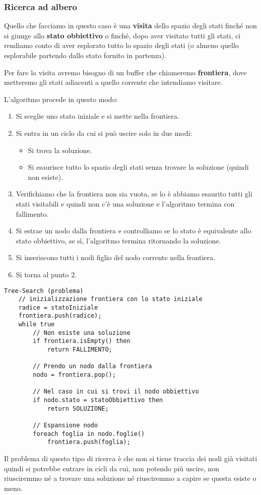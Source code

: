 \subsubsection{Ricerca ad albero}
Quello che facciamo in questo caso \`e una \textbf{visita} dello spazio degli stati finch\'e non
si giunge allo \textbf{stato obbiettivo} o finch\'e, dopo aver visitato tutti gli stati, ci
rendiamo conto di aver esplorato tutto lo spazio degli stati (o almeno quello esplorabile
partendo dallo stato fornito in partenza).

Per fare la visita avremo bisogno di un buffer che chiameremo \textbf{frontiera}, dove metteremo
gli stati adiacenti a quello corrente che intendiamo visitare.

\newpage
L'algoritmo procede in questo modo:
\begin{enumerate}
	\item Si sceglie uno stato iniziale e si mette nella frontiera.
	\item Si entra in un ciclo da cui si pu\`o uscire solo in due modi:
	      \begin{itemize}
		      \item Si trova la soluzione.
		      \item Si esaurisce tutto lo spazio degli stati senza trovare la soluzione (quindi
		            non esiste).
	      \end{itemize}
	\item Verifichiamo che la frontiera non sia vuota, se lo \`e abbiamo esaurito tutti gli
	      stati visitabili e quindi non c'\`e una soluzione e l'algoritmo termina con
	      fallimento.
	\item Si estrae un nodo dalla frontiera e controlliamo se lo stato \`e equivalente allo
	      stato obbiettivo, se s\`i, l'algoritmo termina ritornando la soluzione.
	\item Si inseriscono tutti i nodi figlio del nodo corrente nella frontiera.
	\item Si torna al punto 2.
\end{enumerate}
\begin{lstlisting}[style=pseudo-style]
Tree-Search (problema)
	// inizializzazione frontiera con lo stato iniziale
	radice = statoIniziale
	frontiera.push(radice);
	while true
		// Non esiste una soluzione
		if frontiera.isEmpty() then
			return FALLIMENTO;
		
		// Prendo un nodo dalla frontiera
		nodo = frontiera.pop();
		
		// Nel caso in cui si trovi il nodo obbiettivo
		if nodo.stato = statoObbiettivo then
			return SOLUZIONE;
		
		// Espansione nodo
		foreach foglia in nodo.foglie()
			frontiera.push(foglia);
\end{lstlisting}
Il problema di questo tipo di ricerca \`e che non si tiene traccia dei nodi gi\`a visitati
quindi si potrebbe entrare in cicli da cui, non potendo pi\`u uscire, non riusciremmo n\'e
a trovare una soluzione n\'e riusciremmo a capire se questa esiste o meno.

